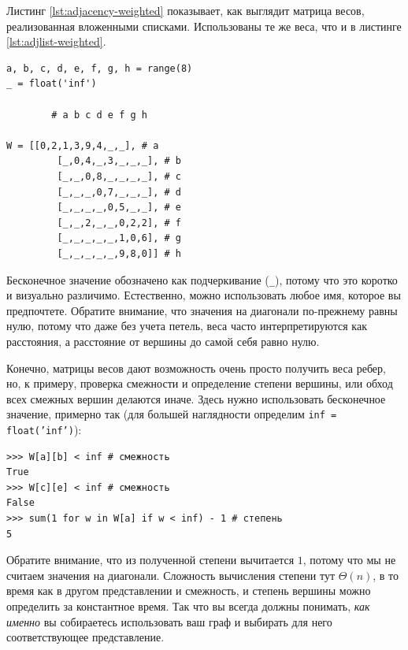 Листинг \ref{lst:adjacency-weighted} показывает, как выглядит матрица весов, реализованная вложенными списками. Использованы те же веса, что и в листинге \ref{lst:adjlist-weighted}.

\begin{lstlisting}[caption={Матрица весов с бесконечными значениями для отсутствующих ребер}, label={lst:adjacency-weighted}]
a, b, c, d, e, f, g, h = range(8)
_ = float('inf')

		# a b c d e f g h

W = [[0,2,1,3,9,4,_,_], # a
	 	 [_,0,4,_,3,_,_,_], # b
		 [_,_,0,8,_,_,_,_], # c
		 [_,_,_,0,7,_,_,_], # d
		 [_,_,_,_,0,5,_,_], # e
		 [_,_,2,_,_,0,2,2], # f
		 [_,_,_,_,_,1,0,6], # g
		 [_,_,_,_,_,9,8,0]] # h
\end{lstlisting}

Бесконечное значение обозначено как подчеркивание (\texttt{\_}), потому что это коротко и визуально различимо. Естественно, можно использовать любое имя, которое вы предпочтете. Обратите внимание, что значения на диагонали по-прежнему равны нулю, потому что даже без учета петель, веса часто интерпретируются как расстояния, а расстояние от вершины до самой себя равно нулю.

Конечно, матрицы весов дают возможность очень просто получить веса ребер, но, к примеру, проверка смежности и определение степени вершины, или обход всех смежных вершин делаются иначе. Здесь нужно использовать бесконечное значение, примерно так (для большей наглядности определим \texttt{inf = float('inf')}):
\begin{lstlisting}
>>> W[a][b] < inf # смежность
True
>>> W[c][e] < inf # смежность
False
>>> sum(1 for w in W[a] if w < inf) - 1 # степень
5
\end{lstlisting}

Обратите внимание, что из полученной степени вычитается $1$, потому что мы не считаем значения на диагонали. Сложность вычисления степени тут $\Theta(n)$, в то время как в другом представлении и смежность, и степень вершины можно определить за константное время. Так что  вы всегда должны понимать, \textit{как именно} вы собираетесь использовать ваш граф и выбирать для него соответствующее представление.

